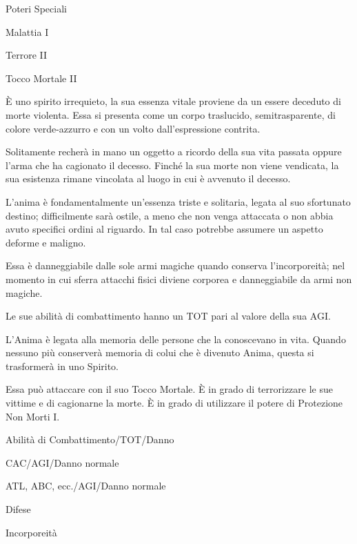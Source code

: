 \begin{parmostro}{Poteri Speciali}
\item Malattia I
\item Terrore II
\item Tocco Mortale II
\end{parmostro}


\`E uno spirito irrequieto, la sua essenza vitale proviene da un
essere deceduto di morte violenta. Essa si presenta come un corpo
traslucido, semitrasparente, di colore verde-azzurro e con un volto
dall'espressione contrita.

Solitamente recher\`a in mano un oggetto a ricordo della sua vita
passata oppure l'arma che ha cagionato il decesso. Finch\'e la sua
morte non viene vendicata, la sua esistenza rimane vincolata al luogo
in cui \`e avvenuto il decesso.

L'anima \`e fondamentalmente un'essenza triste e solitaria, legata al
suo sfortunato destino; difficilmente sar\`a ostile, a meno che non
venga attaccata o non abbia avuto specifici ordini al riguardo. In tal
caso potrebbe assumere un aspetto deforme e maligno.

Essa \`e danneggiabile dalle sole armi magiche quando conserva
l'incorporeit\`a; nel momento in cui sferra attacchi fisici diviene
corporea e danneggiabile da armi non magiche.

Le sue abilit\`a di combattimento hanno un TOT pari al valore della
sua AGI.

 L'Anima \`e legata alla memoria delle persone che la
conoscevano in vita. Quando nessuno pi\`u conserver\`a memoria di
colui che \`e divenuto Anima, questa si trasformer\`a in uno
Spirito. 

Essa pu\`o attaccare con il suo Tocco Mortale. \`E in grado
di terrorizzare le sue vittime e di cagionarne la morte. \`E in grado
di utilizzare il potere di Protezione Non Morti I.


\begin{parmostro}{Abilit\`a di Combattimento/TOT/Danno}
\item CAC/AGI/Danno normale
\item ATL, ABC, ecc./AGI/Danno normale
\end{parmostro}

\begin{parmostro}{Difese}
\item  Incorporeit\`a
\end{parmostro}

